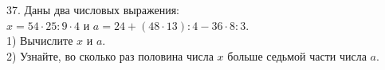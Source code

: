 37. Даны два числовых выражения:\\
$x=54\cdot25:9\cdot4$ и $a=24+(48\cdot13):4-36\cdot8:3.$\\
1) Вычислите $x$ и $a.$\\
2) Узнайте, во сколько раз половина числа $x$ больше седьмой части числа $a.$\\
